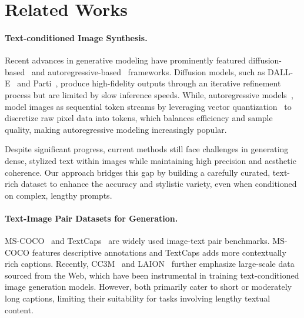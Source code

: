 


\section{Related Works}
\label{sec:related_works}

\paragraph{Text-conditioned Image Synthesis.}
Recent advances in generative modeling have prominently featured diffusion-based~\cite{song2019generative,ho2020denoising,ho2022classifier} and autoregressive-based~\cite{ramesh2021zero,esser2021taming} frameworks. Diffusion models, such as DALL-E~\cite{dalle} and Parti~\cite{parti}, produce high-fidelity outputs through an iterative refinement process but are limited by slow inference speeds. 
While, autoregressive models~\cite{unifiedio2,emu,anygpt,llamagen}, model images as sequential token streams by leveraging vector quantization~\cite{van2017neural} to discretize raw pixel data into tokens, which balances efficiency and sample quality, making autoregressive modeling increasingly popular.

Despite significant progress, current methods still face challenges in generating dense, stylized text within images while maintaining high precision and aesthetic coherence.
Our approach bridges this gap by building a carefully curated, text-rich dataset to enhance the accuracy and stylistic variety, even when conditioned on complex, lengthy prompts.


\paragraph{Text-Image Pair Datasets for Generation.}

MS-COCO~\cite{mscoco} and TextCaps~\cite{textcaps} are widely used image-text pair benchmarks.
MS-COCO features descriptive annotations and TextCaps adds more contextually rich captions.
Recently, CC3M~\cite{cc12m} and LAION~\cite{laion} further emphasize large-scale data sourced from the Web, which have been instrumental in training text-conditioned image generation models.
However, both primarily cater to short or moderately long captions, limiting their suitability for tasks involving lengthy textual content.

